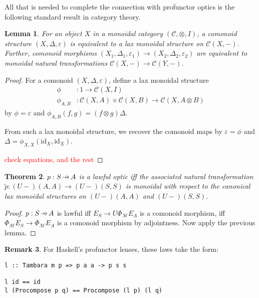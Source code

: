 \documentclass[11pt,a4paper]{article}
\theoremstyle{plain}
\newtheorem{theorem}{Theorem}[subsection]
\newtheorem{lemma}[theorem]{Lemma}
\theoremstyle{definition}
\newtheorem{remark}[theorem]{Remark}
\newcommand{\C}{\mathscr{C}}
\newcommand{\M}{\mathscr{M}}
\newcommand{\id}{\mathrm{id}}
\newcommand{\hto}{\ensuremath{\,\mathaccent\shortmid\rightarrow\,}}
\newcommand{\todo}[1]{\textcolor{red}{\small #1}}
\begin{document}
All that is needed to complete the connection with profunctor optics is the following standard result in category theory.

\begin{lemma}
  For an object $X$ in a monoidal category $(\C, \otimes, I)$, a comonoid structure $(X,\Delta,\varepsilon)$ is equivalent to a lax monoidal structure on $\C(X, -)$. Further, comonoid morphisms $(X_1,\Delta_1,\varepsilon_1) \to (X_2,\Delta_2,\varepsilon_2)$ are equivalent to monoidal natural transformations $\C(X, -) \to \C(Y, -)$.
\end{lemma}
\begin{proof}
  For a comonoid $(X,\Delta,\varepsilon)$, define a lax monoidal structure
  \begin{align*}
    \phi &: 1 \to \C(X, I) \\
    \phi_{A, B} &: \C(X, A) \times \C(X, B) \to \C(X, A \otimes B)
  \end{align*}
  by $\phi = \varepsilon$ and $\phi_{A, B}(f, g) = (f \otimes g) \Delta$.

  From such a lax monoidal structure, we recover the comonoid maps by $\varepsilon = \phi$ and $\Delta = \phi_{X, X}(\id_X, \id_X)$.

  \todo{check equations, and the rest}
\end{proof}

\begin{theorem}
  $p : S \hto A$ is a lawful optic iff the associated natural transformation $\tilde{p} : (U-)(A,A) \to (U-)(S,S)$ is monoidal with respect to the canonical lax monoidal structures on $(U-)(A,A)$ and $(U-)(S,S)$.
\end{theorem}
\begin{proof}
  $p : S \hto A$ is lawful iff $E_S \rightarrow U \Phi_\M E_A$ is a comonoid morphism, iff $\Phi_\M E_S \rightarrow \Phi_\M E_A$ is a comonoid morphism by adjointness. Now apply the previous lemma.
\end{proof}

\begin{remark}
  For Haskell's profunctor lenses, these laws take the form:
\begin{verbatim}
l :: Tambara m p => p a a -> p s s

l id == id
l (Procompose p q) == Procompose (l p) (l q)
\end{verbatim}
\end{remark}
\end{document}
